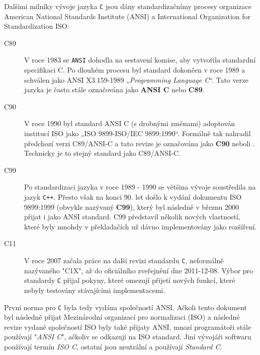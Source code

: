     Dalšími milníky vývoje jazyka \texttt{C} jsou dány standardizačnímy procesy organizace American 
    National Standards Institute (ANSI) a International Organization for Standardization ISO:
    \begin{description}
      \item[C89]    V roce 1983 se \texttt{ANSI} dohodla na sestavení komise, aby vytvořila 
                    standardní specifikaci C. Po dlouhém procesu byl standard dokončen v roce 1989 
                    a schválen jako ANSI X3.159-1989 „\emph{Programming Language C}“. Tato verze 
                    jazyka je často stále označována jako \textbf{ANSI C} nebo \textbf{C89}.
      \item[C90]    V roce 1990 byl standard ANSI C (s drobnými změnami) adoptován institucí ISO 
                    jako „ISO 9899-ISO/IEC 9899:1990“. Formálně tak nahradil předchozí verzi 
                    C89/ANSI-C a tato revize je označována jako \textbf{C90} neboli . 
                    Technicky je to stejný standard jako C89/ANSI-C.
      \item[C99]    Po standardizaci jazyka v roce 1989 - 1990 se většina vývoje soustředila na 
                    jazyk \texttt{C++}. Přesto však na konci 90. let došlo k vydání dokumentu ISO 
                    9899:1999 (obvykle nazývaný \textbf{C99}), který byl následně v březnu 2000 
                    přijat i jako ANSI standard. C99 představil několik nových vlastností, které 
                    byly mnohdy v překladačích už dávno implementovány jako rozšíření.
      \item[C11]    V roce 2007 začala práce na další revizi standardu \texttt{C}, neformálně 
                    nazývaného "C1X", až do oficiálního zveřejnění dne 2011-12-08. Výbor pro 
                    standardy \texttt{C} přijal pokyny, které omezují přijetí nových funkcí, které 
                    nebyly testovány stávajícími implementacemi.
    \end{description}
    
    \begin{tcnote}
      První norma pro \texttt{C} byla tedy vydána společností ANSI. Ačkoli tento dokument byl 
      následně přijat Mezinárodní organizací pro normalizaci (ISO) a následné revize vydané 
      společností ISO byly také přijaty ANSI, mnozí programátoři stále používají "\emph{ANSI C}", 
      ačkoliv se odkazují na ISO standard. Jiní vývojáři softwaru používají termín \emph{ISO C}, 
      ostatní jsou neutrální a používají \emph{Standard C}.
    \end{tcnote}
  
